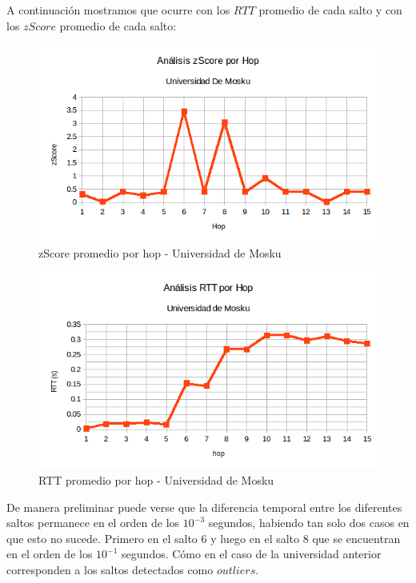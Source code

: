 A continuación mostramos que ocurre con los $RTT$ promedio de cada salto y con los $zScore$ promedio de cada salto:

\begin{figure}[H]
\centering
\includegraphics[width=1\textwidth]{graficos/zScore_rus.png}
\caption{zScore promedio por hop - Universidad de Mosku}
\label{Rus_zs}
\end{figure}

\begin{figure}[H]
\centering
\includegraphics[width=1\textwidth]{graficos/RTT_rus.png}
\caption{RTT promedio por hop - Universidad de Mosku}
\label{Rus_rtt}
\end{figure}

De manera preliminar puede verse que la diferencia temporal entre los diferentes saltos permanece en el orden de los $10^{-3}$ segundos, 
habiendo tan solo dos casos en que esto no sucede. Primero en el salto 6 y luego en el salto 8 que se encuentran en el orden de los $10^{-1}$ 
segundos. Cómo en el caso de la universidad anterior corresponden a los saltos detectados como $outliers$.\\

